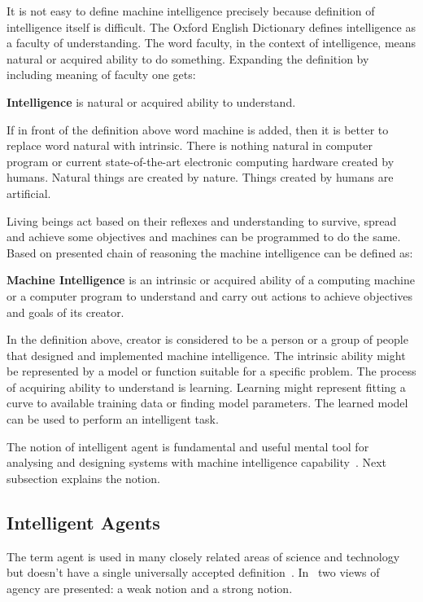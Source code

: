 \documentclass[english, 12pt, a4paper, elec, utf8, online]{aaltothesis}
\begin{document}
It is not easy to define machine intelligence precisely because definition of intelligence itself is difficult. The Oxford English Dictionary defines intelligence as a faculty of understanding. The word faculty, in the context of intelligence, means natural or acquired ability to do something. Expanding the definition by including meaning of faculty one gets:

\begin{center}
\textbf{Intelligence} is natural or acquired ability to understand.
\end{center}

If in front of the definition above word machine is added, then it is better to replace word natural with intrinsic. There is nothing natural in computer program or current state-of-the-art electronic computing hardware created by humans. Natural things are created by nature. Things created by humans are artificial.    

Living beings act based on their reflexes and understanding to survive, spread and achieve some objectives and machines can be programmed to do the same. Based on presented chain of reasoning the machine intelligence can be defined as:

\begin{center}
\textbf{Machine Intelligence} is an intrinsic or acquired ability of a computing machine or a computer program to understand and carry out actions to achieve objectives and goals of its creator.
\end{center}

In the definition above, creator is considered to be a person or a group of people that designed and implemented machine intelligence. The intrinsic ability might be represented by a model or function suitable for a specific problem. The process of acquiring ability to understand is learning. Learning might represent fitting a curve to available training data or finding model parameters. The learned model can be used to perform an intelligent task. 

The notion of intelligent agent is fundamental and useful mental tool for analysing and designing systems with machine intelligence capability~\cite{AIMA}. Next subsection explains the notion.    

\subsection{Intelligent Agents}
The term agent is used in many closely related areas of science and technology but doesn't have a single universally accepted definition~\cite{wooldridge_jennings94}. In~\cite{wooldridge_jennings94} two views of agency are presented: a weak notion and a strong notion.
\end{document}
